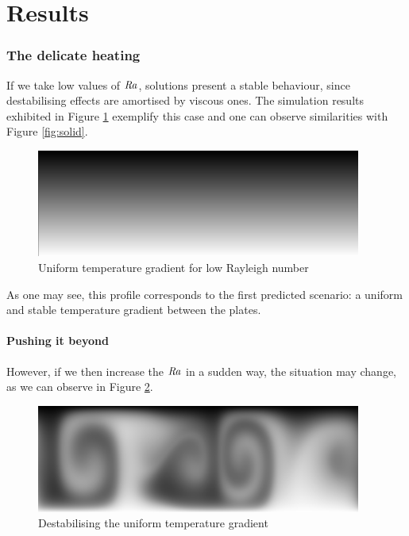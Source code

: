 \documentclass[12pt,oneside]{article}
\newcommand\Ray{\mbox{\textit{Ra}}}  									%
\begin{document}
\section{Results}

\subsubsection{The delicate heating}
If we take low values of $\Ray$, solutions present a stable behaviour, since destabilising effects are amortised by viscous ones. The simulation results exhibited in Figure \ref{fig:delicate} exemplify this case and one can observe similarities with Figure \ref{fig:solid}.

\begin{figure}[ht]
 \centering
 \includegraphics[width=0.95\textwidth]{09_0040t.png}
 \caption{Uniform temperature gradient for low Rayleigh number}
 \label{fig:delicate}
\end{figure}

As one may see, this profile corresponds to the first predicted scenario: a uniform and stable temperature gradient between the plates.

\paragraph{Pushing it beyond} However, if we then increase the $\Ray$ in a sudden way, the situation may change, as we can observe in Figure \ref{fig:push}.

\begin{figure}[ht]
 \centering
 \includegraphics[width=0.95\textwidth]{15_0006t.png}
 \caption{Destabilising the uniform temperature gradient}
 \label{fig:push}
\end{figure}
\end{document}
